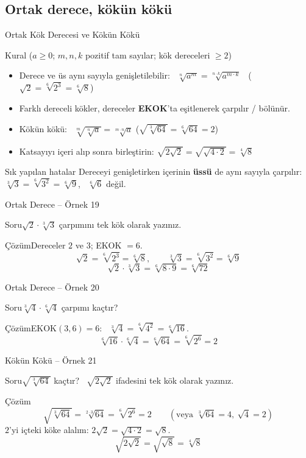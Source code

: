 \documentclass[aspectratio=169,11pt]{beamer}
\newcommand{\soru}[3]{%
\begin{frame}{#1}
  \begin{block}{Soru}\large #2\end{block}
  \pause
  \begin{exampleblock}{Çözüm}\large #3\end{exampleblock}
\end{frame}}
\begin{document}
\subsection{Ortak derece, kökün kökü}
\begin{frame}{Ortak Kök Derecesi ve Kökün Kökü}
\begin{block}{Kural (\(a\ge 0\); \(m,n,k\) pozitif tam sayılar; kök dereceleri \(\ge 2\))}
\begin{itemize}
\item Derece ve üs aynı sayıyla genişletilebilir: \ \(\sqrt[n]{a^m}=\sqrt[n\cdot k]{a^{m\cdot k}}\) \ (\(\sqrt2=\sqrt[6]{2^3}=\sqrt[6]{8}\))
\item Farklı dereceli kökler, dereceler \textbf{EKOK}'ta eşitlenerek çarpılır / bölünür.
\item Kökün kökü: \ \(\sqrt[m]{\sqrt[n]{a}}=\sqrt[m\cdot n]{a}\) \qquad (\(\sqrt{\sqrt[3]{64}}=\sqrt[6]{64}=2\))
\item Katsayıyı içeri alıp sonra birleştirin: \(\sqrt{2\sqrt2}=\sqrt{\sqrt{4\cdot 2}}=\sqrt[4]{8}\)
\end{itemize}
\end{block}
\begin{alertblock}{Sık yapılan hatalar}
Dereceyi genişletirken içerinin \textbf{üssü} de aynı sayıyla çarpılır: \(\sqrt[3]{3}=\sqrt[6]{3^2}=\sqrt[6]{9}\), \ \(\sqrt[6]{6}\) değil.
\end{alertblock}
\end{frame}

\soru{Ortak Derece -- Örnek 19}
{\(\sqrt2\cdot\sqrt[3]{3}\) çarpımını tek kök olarak yazınız.}
{Dereceler \(2\) ve \(3\); EKOK \(=6\).
\[\sqrt2=\sqrt[6]{2^3}=\sqrt[6]{8},\qquad \sqrt[3]{3}=\sqrt[6]{3^2}=\sqrt[6]{9}\]
\[\sqrt2\cdot\sqrt[3]{3}=\sqrt[6]{8\cdot 9}=\sqrt[6]{72}\]}

\soru{Ortak Derece -- Örnek 20}
{\(\sqrt[3]{4}\cdot\sqrt[6]{4}\) çarpımı kaçtır?}
{EKOK\((3,6)=6\): \ \(\sqrt[3]{4}=\sqrt[6]{4^2}=\sqrt[6]{16}\).
\[\sqrt[6]{16}\cdot\sqrt[6]{4}=\sqrt[6]{64}=\sqrt[6]{2^6}=2\]}

\soru{Kökün Kökü -- Örnek 21}
{\(\sqrt{\sqrt[3]{64}}\) kaçtır? \ \(\sqrt{2\sqrt2}\) ifadesini tek kök olarak yazınız.}
{\[\sqrt{\sqrt[3]{64}}=\sqrt[2\cdot 3]{64}=\sqrt[6]{2^6}=2\qquad(\text{veya } \sqrt[3]{64}=4,\ \sqrt4=2)\]
\(2\)'yi içteki köke alalım: \(2\sqrt2=\sqrt{4\cdot 2}=\sqrt8\).
\[\sqrt{2\sqrt2}=\sqrt{\sqrt8}=\sqrt[4]{8}\]}
\end{document}
